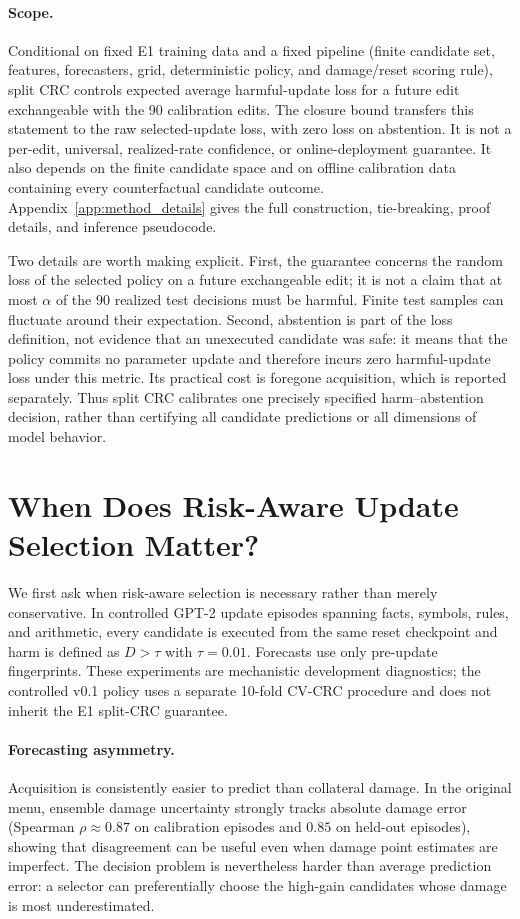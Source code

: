 \documentclass{article} %
\begin{document}
\paragraph{Scope.} Conditional on fixed E1 training data and a fixed pipeline
(finite candidate set, features, forecasters, grid, deterministic policy, and
damage/reset scoring rule), split CRC controls expected average
harmful-update loss for a future edit exchangeable with the 90 calibration
edits. The closure bound transfers this statement to the raw selected-update
loss, with zero loss on abstention. It is not a per-edit, universal,
realized-rate confidence, or online-deployment guarantee. It also depends on
the finite candidate space and on offline calibration data containing every
counterfactual candidate outcome. Appendix~\ref{app:method_details} gives the
full construction, tie-breaking, proof details, and inference pseudocode.

Two details are worth making explicit. First, the guarantee concerns the
random loss of the selected policy on a future exchangeable edit; it is not a
claim that at most $\alpha$ of the 90 realized test decisions must be harmful.
Finite test samples can fluctuate around their expectation. Second, abstention
is part of the loss definition, not evidence that an unexecuted candidate was
safe: it means that the policy commits no parameter update and therefore
incurs zero harmful-update loss under this metric. Its practical cost is
foregone acquisition, which is reported separately. Thus split CRC calibrates
one precisely specified harm--abstention decision, rather than certifying all
candidate predictions or all dimensions of model behavior.

\section{When Does Risk-Aware Update Selection Matter?}
\label{sec:controlled}

We first ask when risk-aware selection is necessary rather than merely
conservative. In controlled GPT-2 update episodes spanning facts, symbols,
rules, and arithmetic, every candidate is executed from the same reset
checkpoint and harm is defined as $D>\tau$ with $\tau=0.01$. Forecasts use only
pre-update fingerprints. These experiments are mechanistic development
diagnostics; the controlled v0.1 policy uses a separate 10-fold CV-CRC
procedure and does not inherit the E1 split-CRC guarantee.

\paragraph{Forecasting asymmetry.}
Acquisition is consistently easier to predict than collateral damage. In the
original menu, ensemble damage uncertainty strongly tracks absolute damage
error (Spearman $\rho\approx0.87$ on calibration episodes and $0.85$ on
held-out episodes), showing that disagreement can be useful even when damage
point estimates are imperfect. The decision problem is nevertheless harder
than average prediction error: a selector can preferentially choose the
high-gain candidates whose damage is most underestimated.
\end{document}
